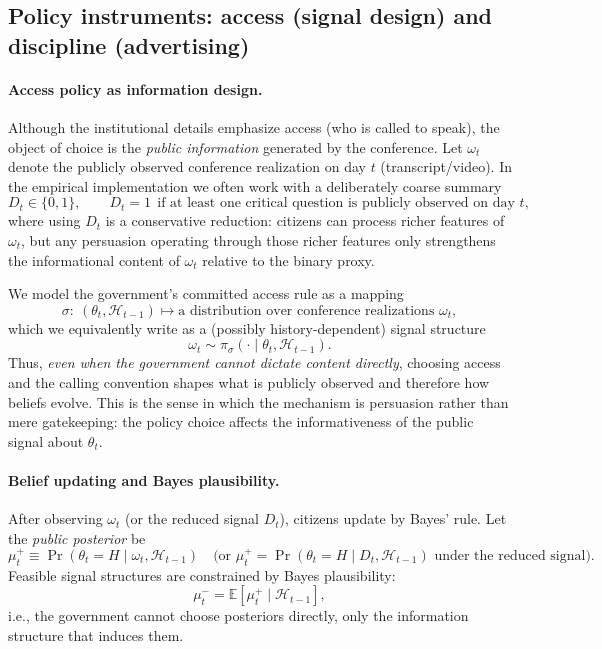 \documentclass[12pt]{article}
\begin{document}
\subsection{Policy instruments: access (signal design) and discipline (advertising)}

\paragraph{Access policy as information design.}
Although the institutional details emphasize access (who is called to speak), the object of choice is the \emph{public information} generated by the conference. Let $\omega_t$ denote the publicly observed conference realization on day $t$ (transcript/video). In the empirical implementation we often work with a deliberately coarse summary
\[
D_t \in \{0,1\},
\qquad
D_t = 1 \ \ \text{if at least one critical question is publicly observed on day } t,
\]
where using $D_t$ is a conservative reduction: citizens can process richer features of $\omega_t$, but any persuasion operating through those richer features only strengthens the informational content of $\omega_t$ relative to the binary proxy.

We model the government's committed access rule as a mapping
\[
\sigma:\ (\theta_t,\mathcal{H}_{t-1}) \mapsto \text{a distribution over conference realizations } \omega_t,
\]
which we equivalently write as a (possibly history-dependent) signal structure
\[
\omega_t \sim \pi_\sigma(\cdot \mid \theta_t,\mathcal{H}_{t-1}).
\]
Thus, \emph{even when the government cannot dictate content directly}, choosing access and the calling convention shapes what is publicly observed and therefore how beliefs evolve. This is the sense in which the mechanism is persuasion rather than mere gatekeeping: the policy choice affects the informativeness of the public signal about $\theta_t$.

\paragraph{Belief updating and Bayes plausibility.}
After observing $\omega_t$ (or the reduced signal $D_t$), citizens update by Bayes' rule. Let the \emph{public posterior} be
\[
\mu_t^{+}\equiv \Pr(\theta_t=H\mid \omega_t,\mathcal{H}_{t-1})
\quad\text{(or }\mu_t^+=\Pr(\theta_t=H\mid D_t,\mathcal{H}_{t-1})\text{ under the reduced signal).}
\]
Feasible signal structures are constrained by Bayes plausibility:
\[
\mu_t^{-}=\mathbb{E}\!\left[\mu_t^{+}\mid \mathcal{H}_{t-1}\right],
\]
i.e., the government cannot choose posteriors directly, only the information structure that induces them.
\end{document}
